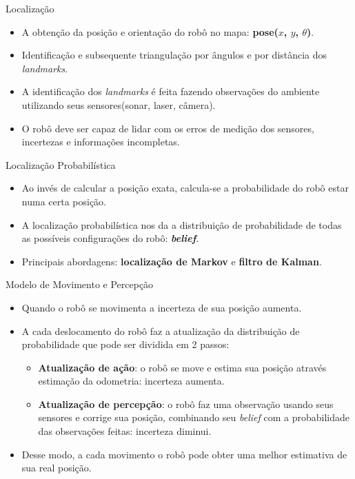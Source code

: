\documentclass{beamer}
\newlength{\wideitemsep}
\let\olditem\item
\renewcommand{\item}{\setlength{\itemsep}{\wideitemsep}\olditem}
\begin{document}
\begin{frame}{Localização}

 \begin{itemize}
  \item A obtenção da posição e orientação do robô no mapa: \textbf{pose($x$, $y$, $\theta$)}.
  
  \item Identificação e subsequente triangulação por ângulos e por distância dos \textit{landmarks}.
  
  \item A identificação dos \textit{landmarks} 
 é feita fazendo observações do ambiente utilizando seus sensores(sonar, laser, câmera).
 
  \item O robô deve ser capaz de lidar com os erros de medição dos sensores, 
 incertezas e informações incompletas.
\end{itemize}
\end{frame}

\begin{frame}{Localização Probabilística}
\begin{itemize}
  \item Ao invés de calcular a posição exata, calcula-se a 
  probabilidade do robô estar numa certa posição.
  \item A localização probabilística nos da a distribuição de probabilidade de todas as possíveis 
 configurações do robô: \textit{\textbf{belief}}.
  \item Principais abordagens: \textbf{localização de Markov} e \textbf{filtro de Kalman}.
\end{itemize}
\end{frame}

\begin{frame}{Modelo de Movimento e Percepção}
\begin{itemize}
\item Quando o robô se movimenta a incerteza de sua posição aumenta. 
\item A cada deslocamento do robô faz a atualização da distribuição de probabilidade que pode ser dividida em 2 passos:
   \begin{itemize}
  \item \textbf{Atualização de ação}: o robô se move e estima sua posição através estimação da odometria: incerteza aumenta.
  \item \textbf{Atualização de percepção}: o robô faz uma observação usando seus sensores e corrige sua posição, 
  combinando seu \textit{belief} com a probabilidade das observações feitas: incerteza diminui.
 \end{itemize}
 
 \item Desse modo, a cada movimento o robô pode obter uma melhor estimativa de sua real posição.
 \end{itemize}
\end{frame}
 
\end{document}
